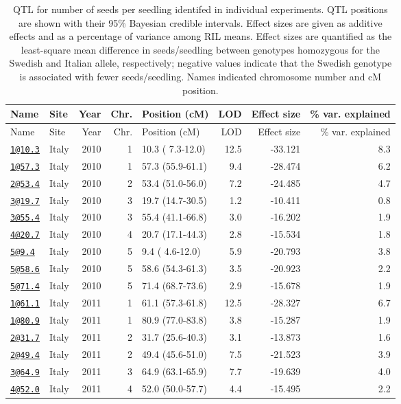 \documentclass[]{article}
\begin{document}
\begin{longtable}[]{@{}llrrlrrr@{}}
\caption{\label{tab:individual-tfit-qtl}QTL for number of seeds per seedling identifed in individual experiments. QTL positions are shown with their 95\% Bayesian credible intervals. Effect sizes are given as additive effects and as a percentage of variance among RIL means. Effect sizes are quantified as the least-square mean difference in seeds/seedling between genotypes homozygous for the Swedish and Italian allele, respectively; negative values indicate that the Swedish genotype is associated with fewer seeds/seedling. Names indicated chromosome number and cM position.}\tabularnewline
\toprule
Name & Site & Year & Chr. & Position (cM) & LOD & Effect size & \% var. explained\tabularnewline
\midrule
\endfirsthead
\toprule
Name & Site & Year & Chr. & Position (cM) & LOD & Effect size & \% var. explained\tabularnewline
\midrule
\endhead
\href{mailto:1@10.3}{\nolinkurl{1@10.3}} & Italy & 2010 & 1 & 10.3 ( 7.3-12.0) & 12.5 & -33.121 & 8.3\tabularnewline
\href{mailto:1@57.3}{\nolinkurl{1@57.3}} & Italy & 2010 & 1 & 57.3 (55.9-61.1) & 9.4 & -28.474 & 6.2\tabularnewline
\href{mailto:2@53.4}{\nolinkurl{2@53.4}} & Italy & 2010 & 2 & 53.4 (51.0-56.0) & 7.2 & -24.485 & 4.7\tabularnewline
\href{mailto:3@19.7}{\nolinkurl{3@19.7}} & Italy & 2010 & 3 & 19.7 (14.7-30.5) & 1.2 & -10.411 & 0.8\tabularnewline
\href{mailto:3@55.4}{\nolinkurl{3@55.4}} & Italy & 2010 & 3 & 55.4 (41.1-66.8) & 3.0 & -16.202 & 1.9\tabularnewline
\href{mailto:4@20.7}{\nolinkurl{4@20.7}} & Italy & 2010 & 4 & 20.7 (17.1-44.3) & 2.8 & -15.534 & 1.8\tabularnewline
\href{mailto:5@9.4}{\nolinkurl{5@9.4}} & Italy & 2010 & 5 & 9.4 ( 4.6-12.0) & 5.9 & -20.793 & 3.8\tabularnewline
\href{mailto:5@58.6}{\nolinkurl{5@58.6}} & Italy & 2010 & 5 & 58.6 (54.3-61.3) & 3.5 & -20.923 & 2.2\tabularnewline
\href{mailto:5@71.4}{\nolinkurl{5@71.4}} & Italy & 2010 & 5 & 71.4 (68.7-73.6) & 2.9 & -15.678 & 1.9\tabularnewline
\href{mailto:1@61.1}{\nolinkurl{1@61.1}} & Italy & 2011 & 1 & 61.1 (57.3-61.8) & 12.5 & -28.327 & 6.7\tabularnewline
\href{mailto:1@80.9}{\nolinkurl{1@80.9}} & Italy & 2011 & 1 & 80.9 (77.0-83.8) & 3.8 & -15.287 & 1.9\tabularnewline
\href{mailto:2@31.7}{\nolinkurl{2@31.7}} & Italy & 2011 & 2 & 31.7 (25.6-40.3) & 3.1 & -13.873 & 1.6\tabularnewline
\href{mailto:2@49.4}{\nolinkurl{2@49.4}} & Italy & 2011 & 2 & 49.4 (45.6-51.0) & 7.5 & -21.523 & 3.9\tabularnewline
\href{mailto:3@64.9}{\nolinkurl{3@64.9}} & Italy & 2011 & 3 & 64.9 (63.1-65.9) & 7.7 & -19.639 & 4.0\tabularnewline
\href{mailto:4@52.0}{\nolinkurl{4@52.0}} & Italy & 2011 & 4 & 52.0 (50.0-57.7) & 4.4 & -15.495 & 2.2\tabularnewline

\end{longtable}
\end{document}
